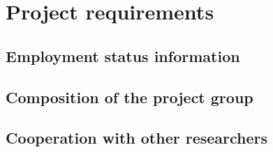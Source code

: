 \documentclass[10pt,fleqn,twoside]{article}
\begin{document}
\todo{[Text]}

% 
% 
% 
% 
% 
% 
% 

\section{Project requirements}
\renewcommand{\leftmark}{\sc Project requirements}

\subsection{Employment status information}

\todo{[Text]}

%

\subsection{Composition of the project group}

\todo{[Text]}

\subsection{Cooperation with other researchers}
\end{document}
